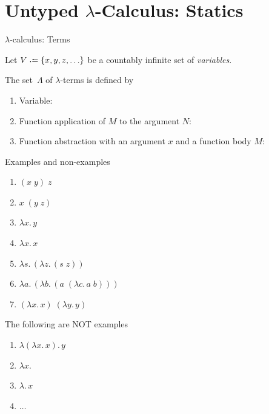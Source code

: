 \section{Untyped $\lambda$-Calculus: Statics}

\begin{frame}{$\lambda$-calculus: Terms}

Let $V \defeq \{ x, y, z, \ldots \}$ be a countably infinite set of
\emph{variables}.
\begin{definition}
   The set~$\Lambda$ of \alert{$\lambda$-terms} is defined
  by
  \begin{enumerate}
    \item Variable:
      \begin{prooftree}
      \end{prooftree}

    \item Function application of $M$ to the argument $N$:
      \begin{prooftree}
      \end{prooftree}

    \item Function abstraction with an argument $x$ and a function body $M$:
      \begin{prooftree}
      \end{prooftree}
  \end{enumerate}
\end{definition}
\end{frame}

\begin{frame}{Examples and non-examples}
  \begin{enumerate}
    \item $(x\;y)\;z$
    \item $x\;(y\; z)$
    \item $\lambda x.\, y$
    \item $\lambda x.\, x$
    \item $\lambda s.\,(\lambda z.\, (s \;z))$
    \item $\lambda a.\,(\lambda b.\, (a\;(\lambda c.\, a\; b)))$
    \item $(\lambda x.\, x)\;(\lambda y.\, y)$
  \end{enumerate}
  The following are NOT examples
  \begin{enumerate}
    \item $\lambda (\lambda x.\, x).\, y$
    \item $\lambda x. $
    \item $\lambda.\, x$
    \item $\dots$
  \end{enumerate}
\end{frame}

